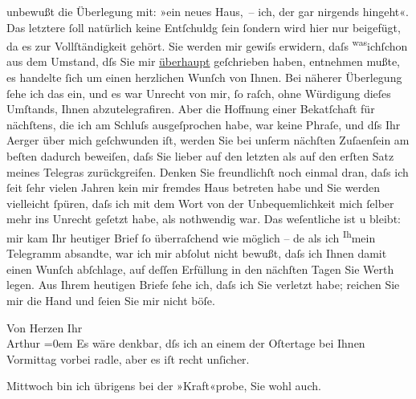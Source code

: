                unbewußt die Überlegung mit: »ein neues Haus, – ich, der gar nirgends hingeht«. Das
               letztere{ }ſoll natürlich keine Entſchuldg{ }ſein{ }ſondern \strikeout{\textcolor{gray}{aus}} wird hier nur beigefügt, da es zur
               Vollſtändigkeit gehört. {\pb}Sie werden mir gewiſs erwidern,
               daſs \substVorne{}\textsuperscript{was}\substDazwischen{}ich\substHinten{}{ }ſchon aus dem Umstand, dſs Sie mir \uline{überhaupt} geſchrieben haben, entnehmen mußte, es
               handelte{ }ſich um einen herzlichen Wunſch von Ihnen. Bei näherer Überlegung{ }ſehe ich
               das ein, und es war Unrecht {\pb}von mir,{ }ſo raſch, ohne
               Würdigung dieſes Umſtands, Ihnen abzutelegrafiren. Aber die Hoffnung einer Beka{\geminationn}tſchaft für nächſtens, die ich am Schluſs ausgeſprochen
               habe, war keine Phraſe, und dſs Ihr Aerger über mich geſchwunden iſt, werden Sie bei
               unſerm nächſten {\pb}Zuſa{\geminationm}enſein
                  \introOben{}am beſten\introOben{} dadurch beweiſen, daſs Sie lieber auf den
               letzten als auf den erſten Satz meines Telegra{\geminationm}s
               zurückgreifen. Denken Sie freundlichſt noch einmal dran, daſs ich{ }ſeit{ }ſehr vielen
               Jahren kein mir fremdes Haus betreten habe und Sie {\pb}werden vielleicht{ }ſpüren, daſs ich mit dem Wort von der Unbequemlichkeit mich{ }ſelber mehr ins Unrecht geſetzt habe, als nothwendig war. Das weſentliche ist u
               bleibt: mir kam Ihr \introOben{}heutiger\introOben{} Brief{ }ſo überraſchend wie
               möglich – \introOben{}de{\geminationn}\introOben{} als ich \substVorne{}\textsuperscript{Ih}\substDazwischen{}mein\substHinten{} Telegramm absandte, {\pb}war ich mir abſolut nicht
               bewußt, daſs ich Ihnen damit einen Wunſch abſchlage, auf deſſen Erfüllung in den
               nächſten Tagen Sie Werth legen. Aus Ihrem heutigen Briefe{ }ſehe ich, daſs ich Sie
               verletzt habe; reichen Sie mir die Hand und{ }ſeien Sie mir nicht böſe.\pend
           
\pstart
           Von Herzen Ihr{\\[\baselineskip]}\spacefill\mbox{Arthur}\pend
           \leftskip=0em{}
\pstart
           \noindent{}{\pb}Es wäre denkbar, dſs ich an einem der
                     Oſtertage bei Ihnen Vormittag vorbei radle, aber es iſt recht
                  unſicher.\pend
           
\pstart
           Mittwoch bin ich übrigens bei der »Kraft«probe, Sie wohl auch.\pend
           
